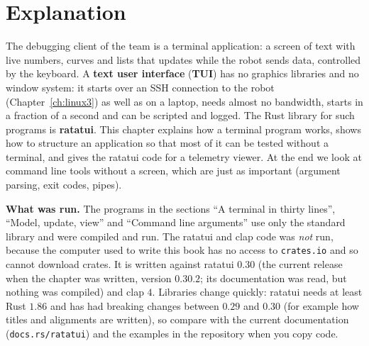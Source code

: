 \label{ch:rust9}

\section*{Explanation}
The debugging client of the team is a terminal application: a screen of text with live numbers, curves and lists that updates while the robot sends data, controlled by the keyboard. A \textbf{text user interface} (\textbf{TUI}) has no graphics libraries and no window system: it starts over an SSH connection to the robot (Chapter~\ref{ch:linux3}) as well as on a laptop, needs almost no bandwidth, starts in a fraction of a second and can be scripted and logged. The Rust library for such programs is \textbf{ratatui}. This chapter explains how a terminal program works, shows how to structure an application so that most of it can be tested without a terminal, and gives the ratatui code for a telemetry viewer. At the end we look at command line tools without a screen, which are just as important (argument parsing, exit codes, pipes).

\textbf{What was run.} The programs in the sections ``A terminal in thirty lines'', ``Model, update, view'' and ``Command line arguments'' use only the standard library and were compiled and run. The ratatui and clap code was \emph{not} run, because the computer used to write this book has no access to \verb!crates.io! and so cannot download crates. It is written against ratatui $0.30$ (the current release when the chapter was written, version $0.30.2$; its documentation was read, but nothing was compiled) and clap $4$. Libraries change quickly: ratatui needs at least Rust $1.86$ and has had breaking changes between $0.29$ and $0.30$ (for example how titles and alignments are written), so compare with the current documentation (\verb!docs.rs/ratatui!) and the examples in the repository when you copy code.

